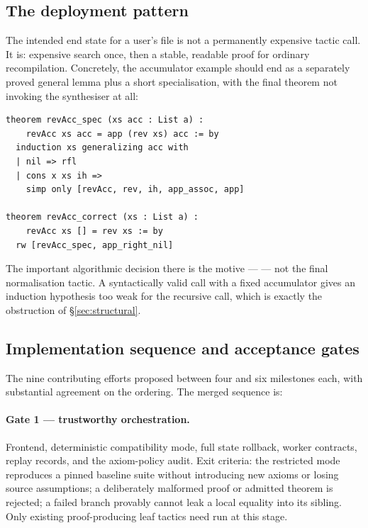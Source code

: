 \subsection{The deployment pattern}

The intended end state for a user's file is not a permanently expensive tactic
call. It is: expensive search once, then a stable, readable proof for ordinary
recompilation. Concretely, the accumulator example should end as a separately
proved general lemma plus a short specialisation, with the final theorem not
invoking the synthesiser at all:

\begin{lstlisting}
theorem revAcc_spec (xs acc : List a) :
    revAcc xs acc = app (rev xs) acc := by
  induction xs generalizing acc with
  | nil => rfl
  | cons x xs ih =>
    simp only [revAcc, rev, ih, app_assoc, app]

theorem revAcc_correct (xs : List a) :
    revAcc xs [] = rev xs := by
  rw [revAcc_spec, app_right_nil]
\end{lstlisting}

The important algorithmic decision there is the motive ---  --- not the final normalisation tactic. A syntactically valid 
call with a fixed accumulator gives an induction hypothesis too weak for the
recursive call, which is exactly the obstruction of \S\ref{sec:structural}.

\subsection{Implementation sequence and acceptance gates}

The nine contributing efforts proposed between four and six milestones each,
with substantial agreement on the ordering. The merged sequence is:

\paragraph{Gate 1 --- trustworthy orchestration.}
Frontend, deterministic compatibility mode, full state rollback, worker
contracts, replay records, and the axiom-policy audit. Exit criteria: the
restricted mode reproduces a pinned baseline suite without introducing new
axioms or losing source assumptions; a deliberately malformed proof or admitted
theorem is rejected; a failed branch provably cannot leak a local equality into
its sibling. Only existing proof-producing leaf tactics need run at this stage.

